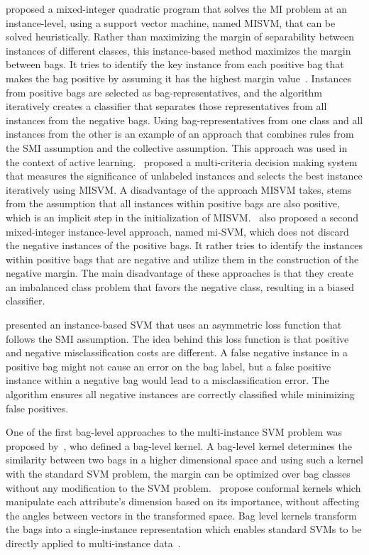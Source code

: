 \cite{Andrews2002} proposed a mixed-integer quadratic program that solves the MI problem at an instance-level, using a support vector machine, named MISVM, that can be solved heuristically. Rather than maximizing the margin of separability between instances of different classes, this instance-based method maximizes the margin between bags. It tries to identify the key instance from each positive bag that makes the bag positive by assuming it has the highest margin value~\citep{Herrera2016}. Instances from positive bags are selected as bag-representatives, and the algorithm iteratively creates a classifier that separates those representatives from all instances from the negative bags. Using bag-representatives from one class and all instances from the other is an example of an approach that combines rules from the SMI assumption and the collective assumption. This approach was used in the context of active learning.~\cite{Wang20143106} proposed a multi-criteria decision making system that measures the significance of unlabeled instances and selects the best instance iteratively using MISVM. A disadvantage of the approach MISVM takes, stems from the assumption that all instances within positive bags are also positive, which is an implicit step in the initialization of MISVM.~\cite{Andrews2002} also proposed a second mixed-integer instance-level approach, named mi-SVM, which does not discard the negative instances of the positive bags. It rather tries to identify the instances within positive bags that are negative and utilize them in the construction of the negative margin. The main disadvantage of these approaches is that they create an imbalanced class problem that favors the negative class, resulting in a biased classifier.

\cite{Yang2006} presented an instance-based SVM that uses an asymmetric loss function that follows the SMI assumption. The idea behind this loss function is that positive and negative misclassification costs are different. A false negative instance in a positive bag might not cause an error on the bag label, but a false positive instance within a negative bag would lead to a misclassification error. The algorithm ensures all negative instances are correctly classified while minimizing false positives.

One of the first bag-level approaches to the multi-instance SVM problem was proposed by~\cite{Smola2002}, who defined a bag-level kernel. A bag-level kernel determines the similarity between two bags in a higher dimensional space and using such a kernel with the standard SVM problem, the margin can be optimized over bag classes without any modification to the SVM problem.~\cite{Blaschko2006} propose conformal kernels which manipulate each attribute's dimension based on its importance, without affecting the angles between vectors in the transformed space. Bag level kernels transform the bags into a single-instance representation which enables standard SVMs to be directly applied to multi-instance data~\citep{Herrera2016}. 

